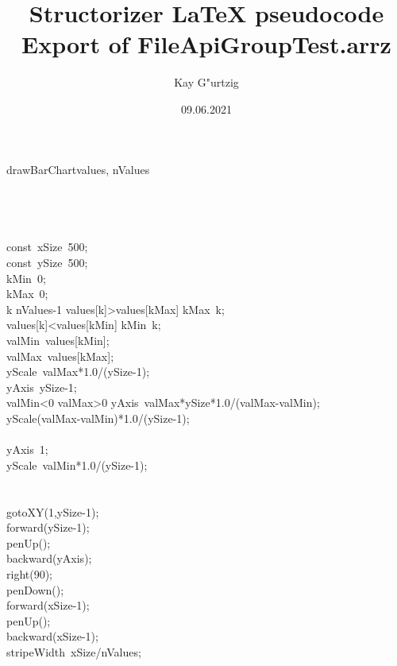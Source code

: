 \documentclass[a4paper,10pt]{article}
\title{Structorizer LaTeX pseudocode Export of FileApiGroupTest.arrz}
\author{Kay G"urtzig}
\date{09.06.2021}
\begin{document}
\begin{pseudocode}{drawBarChart}{values, nValues }
\label{drawBarChart}
\\
\\
\\
\\
  \\
  const\ xSize\gets\ 500;\\
  const\ ySize\gets\ 500;\\
  kMin\gets\ 0;\\
  kMax\gets\ 0;\\
  \FOR k  \TO nValues-1  \DO
    \IF values[k]>values[kMax] \THEN
      kMax\gets\ k;\\
    \ELSE
      \IF values[k]<values[kMin] \THEN
        kMin\gets\ k;\\
  valMin\gets\ values[kMin];\\
  valMax\gets\ values[kMax];\\
  yScale\gets\ valMax*1.0/(ySize-1);\\
  yAxis\gets\ ySize-1;\\
  \IF valMin<0 \THEN
    \IF valMax>0 \THEN
    \BEGIN
      yAxis\gets\ valMax*ySize*1.0/(valMax-valMin);\\
      yScale\gets(valMax-valMin)*1.0/(ySize-1);\\
    \END\\
    \ELSE
    \BEGIN
      yAxis\gets\ 1;\\
      yScale\gets\ valMin*1.0/(ySize-1);\\
    \END\\
  \\
  gotoXY(1,ySize-1);\\
  forward(ySize-1);\\
  penUp();\\
  backward(yAxis);\\
  right(90);\\
  penDown();\\
  forward(xSize-1);\\
  penUp();\\
  backward(xSize-1);\\
  stripeWidth\gets\ xSize/nValues;\\

\end{pseudocode}
\end{document}
